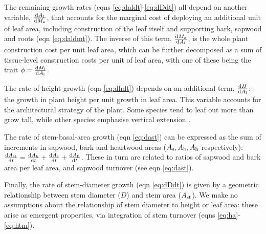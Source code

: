 \documentclass[9pt,twocolumn,twoside,lineno]{pnas-new}
\begin{document}
The remaining growth rates (eqns \ref{eq:daldt}-\ref{eq:dDdt}) all depend on another variable, $\frac{{\rm d}A_{\rm l}} {{\rm d}M_{\rm a}}$, that accounts for the marginal cost of deploying an additional unit of leaf area, including construction of the leaf itself and supporting  bark, sapwood and roots (eqn \ref{eq:daldmt}). The inverse of this term, $\frac{{\rm d}M_{\rm a} }{{\rm d}A_{\rm l}}$, is the whole plant construction cost per unit leaf area, which can be further decomposed as a sum of tissue-level construction costs per unit of leaf area, with one of these being the trait $\phi = \frac{{\rm d}M_{\rm l} }{{\rm d}A_{\rm l}}$.

The rate of height growth (eqn \ref{eq:dhdt}) depends on an additional term, $\frac{{\rm d}H }{{\rm d}A_{\rm l}}$: the growth in plant height per unit growth in leaf area. This variable accounts for the architectural strategy of the plant. Some species tend to leaf out more than grow tall, while other species emphasise vertical extension \citep{Poorter-2006}.

The rate of stem-basal-area growth (eqn \ref{eq:dast}) can be expressed as the sum of increments in sapwood, bark and heartwood areas ($A_{\rm s}, A_{\rm b}, A_{\rm h}$ respectively): $\frac{{\rm d}A_{\rm st}}{{\rm d}t}= \frac{{\rm d}A_{\rm b}}{{\rm d}t} + \frac{{\rm d}A_{\rm s}}{{\rm d}t} + \frac{{\rm d}A_{\rm h}}{{\rm d}t}$. These in turn are related to ratios of sapwood and bark area per leaf area, and sapwood turnover (see eqn \ref{eq:dast}).

Finally, the rate of stem-diameter growth (eqn \ref{eq:dDdt}) is given by a geometric relationship between stem diameter ($D$) and stem area ($A_{\rm st}$). We make no assumptions about the relationship of stem diameter to height or leaf area: these arise as emergent properties, via integration of stem turnover (eqns \ref{eq:ha}-\ref{eq:htm}).
\end{document}

